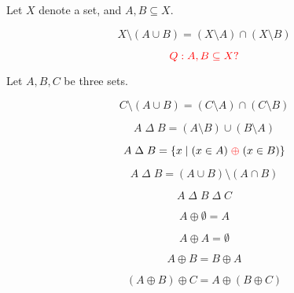 \begin{frame}{}
  \begin{theorem}
    Let $X$ denote a set, and $A, B \subseteq X$.

    \[
      X \setminus (A \cup B) = (X \setminus A) \cap (X \setminus B)
    \]
  \end{theorem}

  \pause
  \vspace{0.50cm}
  \[
    \textcolor{red}{Q: A, B \subseteq X?}
  \]

  \begin{theorem}
    Let $A, B, C$ be three sets.

    \[
      C \setminus (A \cup B) = (C \setminus A) \cap (C \setminus B)
    \]
  \end{theorem}
\end{frame}

\begin{frame}{}
  \begin{definition}
    \[
      A \;\Delta\; B = (A \setminus B) \cup (B \setminus A)
    \]
  \end{definition}

  \[
    A \;\Delta\; B = \{x \mid (x \in A) \;\textcolor{red}{\oplus}\; (x \in B)\}
  \]

  \pause
  \vspace{0.30cm}

  \pause
  \[
    A \;\Delta\; B = (A \cup B) \setminus (A \cap B)
  \]
\end{frame}

\begin{frame}{}
  \[
    A \;\Delta\; B \;\Delta\; C
  \]

  \pause
\end{frame}

\begin{frame}{}
  \[
    A \oplus \emptyset = A
  \]

  \pause
  \[
    A \oplus A = \emptyset
  \]

  \[
    A \oplus B = B \oplus A
  \]

  \[
    (A \oplus B) \oplus C = A \oplus (B \oplus C)
  \]
\end{frame}

